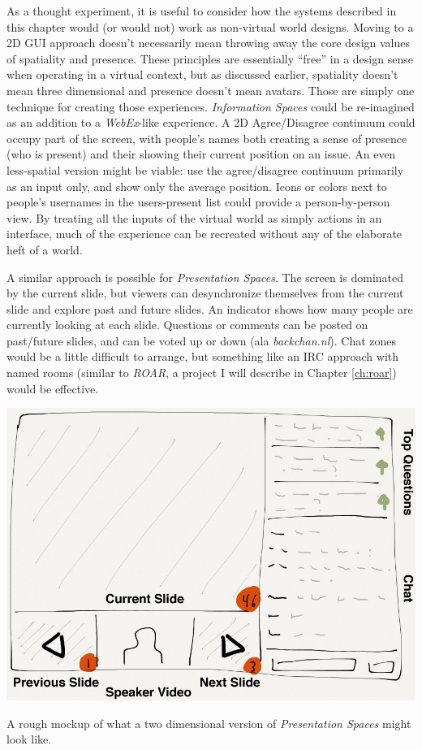 As a thought experiment, it is useful to consider how the systems described in this chapter would (or would not) work as non-virtual world designs. Moving to a 2D GUI approach doesn't necessarily mean throwing away the core design values of spatiality and presence. These principles are essentially ``free'' in a design sense when operating in a virtual context, but as discussed earlier, spatiality doesn't mean three dimensional and presence doesn't mean avatars. Those are simply one technique for creating those experiences. \emph{Information Spaces} could be re-imagined as an addition to a \emph{WebEx}-like experience. A 2D Agree/Disagree continuum could occupy part of the screen, with people's names both creating a sense of presence (who is present) and their showing their current position on an issue. An even less-spatial version might be viable: use the agree/disagree continuum primarily as an input only, and show only the average position. Icons or colors next to people's usernames in the users-present list could provide a person-by-person view. By treating all the inputs of the virtual world as simply actions in an interface, much of the experience can be recreated without any of the elaborate heft of a world.

A similar approach is possible for \emph{Presentation Spaces}. The screen is dominated by the current slide, but viewers can desynchronize themselves from the current slide and explore past and future slides. An indicator shows how many people are currently looking at each slide. Questions or comments can be posted on past/future slides, and can be voted up or down (ala \emph{backchan.nl}). Chat zones would be a little difficult to arrange, but something like an IRC approach with named rooms (similar to \emph{ROAR}, a project I will describe in Chapter \ref{ch:roar}) would be effective. 

\begin{marginfigure}
	\includegraphics{figures/2d-pres-spaces-mockup.png}
	\caption{A rough mockup of what a two dimensional version of \emph{Presentation Spaces} might look like.}
	\label{fig:presspaces_demake}
\end{marginfigure}


